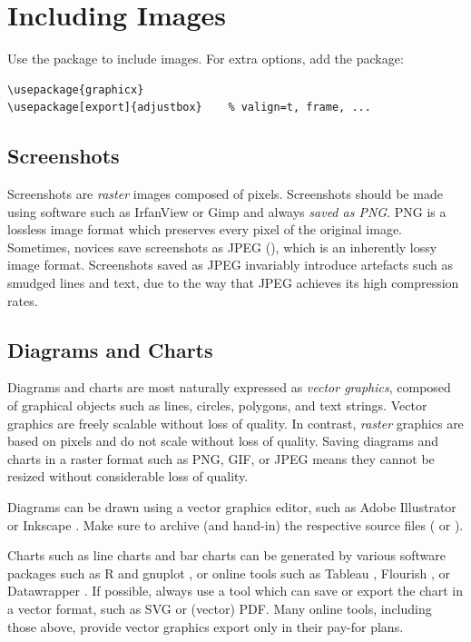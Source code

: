 \section{Including Images}

Use the  package to include images.
For extra options, add the  package:
\begin{lstlisting}
\usepackage{graphicx}
\usepackage[export]{adjustbox}    % valign=t, frame, ...
\end{lstlisting}





\subsection{Screenshots}

Screenshots are \emph{raster} images composed of pixels. Screenshots
should be made using software such as IrfanView or Gimp and always
\emph{saved as PNG}. PNG is a lossless image format which preserves
every pixel of the original image. Sometimes, novices save screenshots
as JPEG (), which is an inherently lossy image
format. Screenshots saved as JPEG invariably introduce artefacts such
as smudged lines and text, due to the way that JPEG achieves its high
compression rates.




\subsection{Diagrams and Charts}

Diagrams and charts are most naturally expressed as \emph{vector
  graphics}, composed of graphical objects such as lines, circles,
polygons, and text strings. Vector graphics are freely scalable
without loss of quality. In contrast, \emph{raster} graphics are based
on pixels and do not scale without loss of quality. Saving diagrams
and charts in a raster format such as PNG, GIF, or JPEG means they
cannot be resized without considerable loss of quality.

Diagrams can be drawn using a vector graphics editor, such as Adobe
Illustrator \parencite{Adobe-Illustrator} or Inkscape
\parencite{Inkscape}. Make sure to archive (and hand-in) the
respective source files ( or ).


Charts such as line charts and bar charts can be generated by various
software packages such as R \parencite{R-Project} and gnuplot
\parencite{gnuplot}, or online tools such as Tableau \parencite{Tableau},
Flourish \parencite{Flourish}, or Datawrapper \parencite{Datawrapper}.
%
If possible, always use a tool which can save or export the chart in a
vector format, such as SVG or (vector) PDF. Many online tools,
including those above, provide vector graphics export only in their
pay-for plans.



